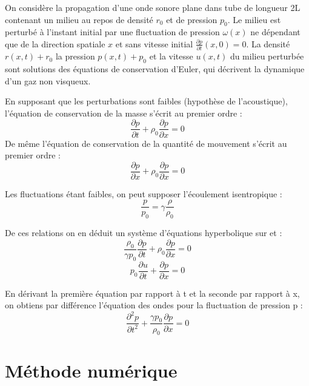 \documentclass[a4paper,10pt]{report} %
\begin{document}
On considère la propagation d’une onde sonore plane dans tube de longueur 2L contenant un milieu au repos de densité $r_0$ et de pression $p_0$. Le milieu est perturbé à l’instant initial par une fluctuation de pression $\omega(x)$ ne dépendant que de la direction spatiale $x$ et sans vitesse initial $\frac{\partial p}{\partial t}(x,0)=0$. La densité$r(x,t)+r_0$ la pression $p(x,t)+p_0$ et la vitesse $u(x,t)$ du milieu perturbée sont solutions des équations de conservation d’Euler, qui décrivent la dynamique d’un gaz non visqueux. 

En supposant que les perturbations sont faibles (hypothèse de
l’acoustique), l’équation de conservation de la masse s’écrit au premier ordre :
\begin{equation}
\frac{\partial p}{\partial t}+\rho_0\frac{\partial p}{\partial x}=0
\end{equation}
De même l’équation de conservation de la quantité de mouvement s’écrit au premier ordre :
\begin{equation}
\frac{\partial p}{\partial x}+\rho_0\frac{\partial p}{\partial x}=0
\end{equation}

Les fluctuations étant faibles, on peut supposer l’écoulement isentropique :
\begin{equation}
\frac{p}{p_0}=\gamma\frac{\rho}{\rho_0}
\end{equation}

De ces relations on en déduit un système d’équations hyperbolique sur  et  :
\begin{equation}
\frac{\rho_0}{\gamma p_0}\frac{\partial p}{\partial t}+\rho_0\frac{\partial p}{\partial x}=0
\end{equation}
\begin{equation}
p_0\frac{\partial u}{\partial t}+\frac{\partial p}{\partial x}=0
\end{equation}

En dérivant la première équation par rapport à t et la seconde par rapport à x, on obtiens par différence l’équation des ondes pour la fluctuation de pression p :
\begin{equation}
\frac{\partial^2 p}{\partial t^2}+\frac{\gamma p_0}{\rho_0}\frac{\partial p}{\partial x}=0
\end{equation}

\chapter{Méthode numérique}
\end{document}
